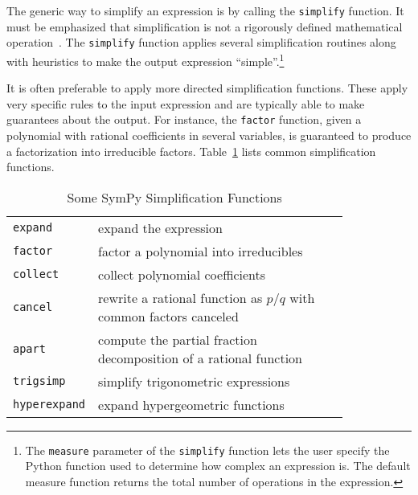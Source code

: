 



The generic way to simplify an expression is by calling the \texttt{simplify}
function.
It must be emphasized that simplification is not a rigorously defined
mathematical operation~\cite{Moses1971simplification}.
The \texttt{simplify} function applies several simplification routines along
with heuristics to make the output expression ``simple''.\footnote{The
\texttt{measure} parameter of the \texttt{simplify}
function lets the user specify the Python function used to determine how complex an
expression is.  The default measure function returns the total number of
operations in the expression.}

It is often preferable to apply more directed simplification functions. These
apply very specific rules to the input expression and are typically able to make
guarantees about the output. For instance, the \texttt{factor} function,
given a polynomial with rational coefficients in several variables,
is guaranteed to
produce a factorization into irreducible factors. Table~\ref{simplify-table}
lists common simplification functions.

\begin{longtable}[htbc]{lp{0.83\linewidth}}
\caption{Some SymPy Simplification Functions\label{simplify-table}}\\
\toprule
\verb|expand| & expand the expression \\
\verb|factor| & factor a polynomial into irreducibles \\
\verb|collect| & collect polynomial coefficients \\
\verb|cancel| & rewrite a rational function as $p/q$ with common factors
canceled \\
\verb|apart| & compute the partial fraction decomposition of a rational function
\\
\verb|trigsimp| & simplify trigonometric expressions~\cite{fu2006automated} \\
\verb|hyperexpand| & expand hypergeometric functions~\cite{Roach1996hyper,roach1997meijerg} \\
\bottomrule
\end{longtable}
